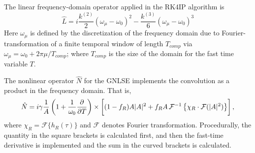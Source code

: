 The linear frequency-domain operator applied in the RK4IP algorithm is
\begin{equation}
\hat{L}=i\frac{k^{(2)}}{2}(\omega_\mu-\omega_0)^2-\frac{k^{(3)}}{6}(\omega_\mu-\omega_0)^3
\end{equation}
Here $\omega_\mu$ is defined by the discretization of the frequency domain due to Fourier-transformation of a finite temporal window of length $T_{comp}$ via $\omega_\mu=\omega_0+2\pi\mu/T_{comp}$; where $T_{comp}$ is the size of the domain for the fast time variable $T$.

The nonlinear operator $\hat{N}$ for the GNLSE implements the convolution as a product in the frequency domain. That is, 
\begin{equation}
\hat{N}=i\gamma\frac{1}{A}\left(1+\frac{1}{\omega_0}\frac{\partial}{\partial T}\right)\times\left[\vphantom{\frac{\partial}{\partial T}}(1-f_R)A|A|^2+f_R A\, \mathcal{F}^{-1}\left\{\chi_R\cdot\mathcal{F}(|A|^2)\right\}\right],
\end{equation}
where $\chi_R=\mathcal{F}\{h_R(\tau)\}$ and $\mathcal{F}$ denotes Fourier transformation. Procedurally, the quantity in the square brackets is calculated first, and then the fast-time derivative is implemented and the sum in the curved brackets is calculated.






	



